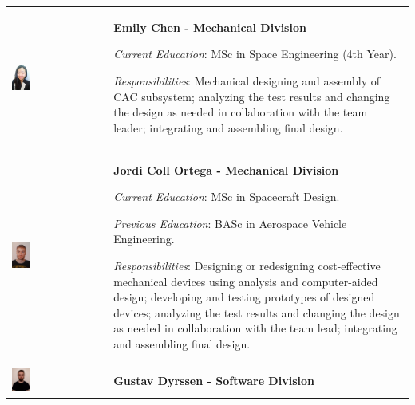 \begin{longtable}[]{m{} m{}}
\includegraphics[width=0.2\textwidth]{1-introduction/img/emily-chen.jpeg} & \textbf{Emily Chen - Mechanical Division}

\smallskip
\textit{Current Education}: MSc in Space Engineering (4th Year).


\smallskip
\textit{Responsibilities}: Mechanical designing and assembly of CAC subsystem; analyzing the test results and changing the design as needed in collaboration with the team leader; integrating and assembling final design. 
\bigskip
\\

\includegraphics[width=0.2\textwidth]{1-introduction/img/jordi-coll-ortega.jpg} & \textbf{Jordi Coll Ortega - Mechanical Division}

\smallskip
\textit{Current Education}: MSc in Spacecraft Design.

\smallskip
\textit{Previous Education}: BASc in Aerospace Vehicle Engineering.

\smallskip
\textit{Responsibilities}: Designing or redesigning cost-effective mechanical devices using analysis and computer-aided design; developing and testing prototypes of designed devices; analyzing the test results and changing the design as needed in collaboration with the team lead; integrating and assembling final design.
\bigskip
\\

\includegraphics[width=0.2\textwidth]{1-introduction/img/gustav-dryssen.jpg} & \textbf{Gustav Dyrssen - Software Division}


\end{longtable}
